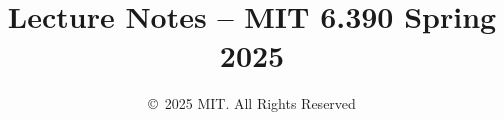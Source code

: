 \documentclass[10pt,oneside]{book}
\title{Lecture Notes -- MIT 6.390 Spring 2025}
\date{\copyright\ 2025 MIT. All Rights Reserved}
\begin{document}
\maketitle
\tableofcontents

\clearpage

















\begin{appendices}
    
    
    
    

    \printindex
    \clearpage
    \glsaddall
    \printglossaries
    \clearpage
\end{appendices}

%
%
%
%
%
\end{document}
